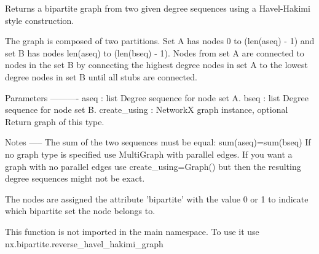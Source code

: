\begin{DoxyVerb}Returns a bipartite graph from two given degree sequences using a
Havel-Hakimi style construction.

The graph is composed of two partitions. Set A has nodes 0 to
(len(aseq) - 1) and set B has nodes len(aseq) to (len(bseq) - 1).
Nodes from set A are connected to nodes in the set B by connecting
the highest degree nodes in set A to the lowest degree nodes in
set B until all stubs are connected.

Parameters
----------
aseq : list
   Degree sequence for node set A.
bseq : list
   Degree sequence for node set B.
create_using : NetworkX graph instance, optional
   Return graph of this type.

Notes
-----
The sum of the two sequences must be equal: sum(aseq)=sum(bseq)
If no graph type is specified use MultiGraph with parallel edges.
If you want a graph with no parallel edges use create_using=Graph()
but then the resulting degree sequences might not be exact.

The nodes are assigned the attribute 'bipartite' with the value 0 or 1
to indicate which bipartite set the node belongs to.

This function is not imported in the main namespace.
To use it use nx.bipartite.reverse_havel_hakimi_graph
\end{DoxyVerb}
 